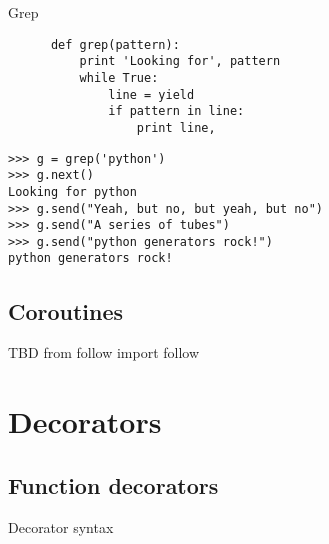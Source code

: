 \documentclass{beamer}
\begin{document}
\begin{frame}[fragile]{Grep}
    \begin{verbatim}
      def grep(pattern):
          print 'Looking for', pattern
          while True:
              line = yield
              if pattern in line:
                  print line,
    \end{verbatim}
    \pause
    \begin{verbatim}
>>> g = grep('python')
>>> g.next()
Looking for python
>>> g.send("Yeah, but no, but yeah, but no")
>>> g.send("A series of tubes")
>>> g.send("python generators rock!")
python generators rock!
    \end{verbatim}
\end{frame}

\subsection{Coroutines}

\begin{frame}{TBD}
  from follow import follow


\end{frame}

\section{Decorators}

\subsection{Function decorators}
\begin{frame}[fragile]{Decorator syntax}
\end{frame}
\end{document}
